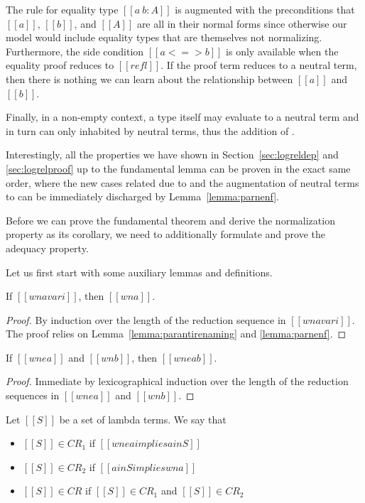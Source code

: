 \documentclass[acmsmall]{acmart}
\begin{document}
The rule for equality type $[[a ~ b : A]]$ is augmented with the preconditions that
$[[a]]$, $[[b]]$, and $[[A]]$ are all in their normal forms since
otherwise our model would include equality types that are themselves
not normalizing. Furthermore, the side condition $[[a <=> b]]$ is only
available when the equality proof reduces to $[[refl]]$. If the proof
term reduces to a neutral term, then there is nothing we can learn
about the relationship between $[[a]]$ and $[[b]]$.

Finally, in a
non-empty context, a type itself may evaluate to a neutral term and in
turn can only inhabited by neutral terms, thus the addition of .

Interestingly, all the properties we have shown in
Section~\ref{sec:logreldep} and \ref{sec:logrelproof} up to the
fundamental lemma can be proven in the exact same order, where the new
cases related due to  and the augmentation of neutral terms
to  can be immediately discharged by
Lemma~\ref{lemma:parnenf}.

Before we can prove the fundamental theorem and derive the
normalization property as its corollary, we need to additionally
formulate and prove the adequacy property.

Let us first start with some auxiliary lemmas and definitions.
\begin{lemma}[Ext Wn]
  \label{lemma:extwn}
  If $[[wn a var i]]$, then $[[wn a]]$.
\end{lemma}
\begin{proof}
  By induction over the length of the reduction sequence in $[[wn a
  var i]]$. The proof relies on Lemma~\ref{lemma:parantirenaming} and
  \ref{lemma:parnenf}.
\end{proof}

\begin{lemma}[wne wn]
  \label{lemma:wnewn}
  If $[[wne a]]$ and $[[wn b]]$, then $[[wne a b]]$.
\end{lemma}
\begin{proof}
  Immediate by lexicographical induction over the length of the reduction sequences in
  $[[wne a]]$ and $[[wn b]]$.
\end{proof}

\begin{definition}[CR]
  Let $[[S]]$ be a set of lambda terms. We say that
  \begin{itemize}
  \item $[[S]] \in CR_1$ if $[[wne a implies a in S]]$
  \item $[[S]] \in CR_2$ if $[[a in S implies wn a]]$
  \item $[[S]] \in CR$ if $[[S]] \in CR_1$ and $[[S]] \in CR_2$
  \end{itemize}
\end{definition}
\end{document}
